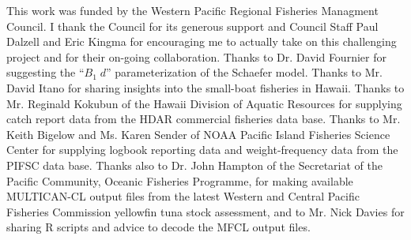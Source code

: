 \documentclass[12pt,letterpaper,twoside]{article}
\begin{document}
\vspace{4ex}
{}
This work was funded by the Western Pacific Regional Fisheries
Managment Council. I thank the Council for its generous support and
Council Staff Paul Dalzell and Eric Kingma for encouraging me to
actually take on this challenging project and for their on-going
collaboration.
Thanks to Dr. David Fournier for suggesting the ``$B_1\;d$''
parameterization of the Schaefer model.
Thanks to Mr. David Itano for sharing insights into the small-boat
fisheries in Hawaii.
Thanks to Mr. Reginald Kokubun of the Hawaii Division of Aquatic
Resources for supplying catch report data from the HDAR commercial
fisheries data base.
Thanks to Mr. Keith Bigelow and Ms. Karen Sender of NOAA Pacific
Island Fisheries Science Center for supplying logbook reporting data and
weight-frequency data from the PIFSC data base.
Thanks also to Dr. John Hampton of the Secretariat of the Pacific
Community, Oceanic Fisheries Programme, for making available
MULTICAN-CL output files from the latest Western and Central Pacific
Fisheries Commission yellowfin tuna stock assessment, and to Mr. Nick
Davies for sharing R scripts and advice to decode the MFCL output files.
\end{document}
